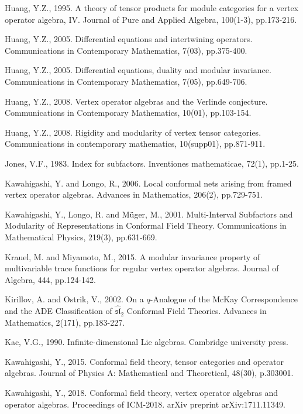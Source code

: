 \documentclass[12pt,a4paper]{article}
\theoremstyle{definition}
\theoremstyle{plain}
\newcommand{\fk}{\mathfrak}
\newcommand{\wht}{\widehat}
\numberwithin{equation}{subsection}
\begin{document}
\begin{thebibliography}{999999}
Huang, Y.Z., 1995. A theory of tensor products for module categories for a vertex operator algebra, IV. Journal of Pure and Applied Algebra, 100(1-3), pp.173-216.

Huang, Y.Z., 2005. Differential equations and intertwining operators. Communications in Contemporary Mathematics, 7(03), pp.375-400.

Huang, Y.Z., 2005. Differential equations, duality and modular invariance. Communications in Contemporary Mathematics, 7(05), pp.649-706.

Huang, Y.Z., 2008. Vertex operator algebras and the Verlinde conjecture. Communications in Contemporary Mathematics, 10(01), pp.103-154.

Huang, Y.Z., 2008. Rigidity and modularity of vertex tensor categories. Communications in contemporary mathematics, 10(supp01), pp.871-911.

Jones, V.F., 1983. Index for subfactors. Inventiones mathematicae, 72(1), pp.1-25.

Kawahigashi, Y. and Longo, R., 2006. Local conformal nets arising from framed vertex operator algebras. Advances in Mathematics, 206(2), pp.729-751.

Kawahigashi, Y., Longo, R. and M\"uger, M., 2001. Multi-Interval Subfactors and Modularity of Representations in Conformal Field Theory. Communications in Mathematical Physics, 219(3), pp.631-669.

Krauel, M. and Miyamoto, M., 2015. A modular invariance property of multivariable trace functions for regular vertex operator algebras. Journal of Algebra, 444, pp.124-142.

Kirillov, A. and Ostrik, V., 2002. On a $q$-Analogue of the McKay Correspondence and the ADE Classification of $\wht{\fk{sl}}_2$ Conformal Field Theories. Advances in Mathematics, 2(171), pp.183-227.

Kac, V.G., 1990. Infinite-dimensional Lie algebras. Cambridge university press.

Kawahigashi, Y., 2015. Conformal field theory, tensor categories and operator algebras. Journal of Physics A: Mathematical and Theoretical, 48(30), p.303001.

Kawahigashi, Y., 2018. Conformal field theory, vertex operator algebras and operator algebras. Proceedings of ICM-2018. arXiv preprint arXiv:1711.11349.


\end{thebibliography}
\end{document}
